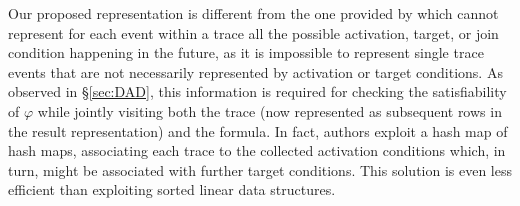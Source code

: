 Our proposed representation is different from the one provided by \cite{BurattinMS16} which cannot represent for each event within a trace all the possible activation, target, or join condition happening in the future, as it is impossible to represent single trace events that are not necessarily represented by activation or target conditions. As observed in \S\ref{sec:DAD}, this information is required for checking the satisfiability of $\varphi$ while jointly visiting both the trace (now represented as subsequent rows in the result representation) and the formula. 
In fact, authors exploit
a hash map of hash maps, associating  each trace to the collected activation conditions which, in turn, might be associated with further target conditions. 
This solution is even less efficient than exploiting sorted linear data structures.


